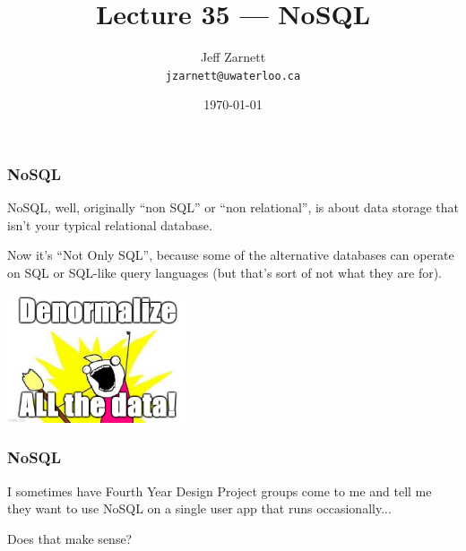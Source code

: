 

\title{Lecture 35 --- NoSQL }

\author{Jeff Zarnett \\ \small \texttt{jzarnett@uwaterloo.ca}}
\date{\today}




\begin{frame}
  \titlepage

 \end{frame}



\begin{frame}
\frametitle{NoSQL}

NoSQL, well, originally ``non SQL'' or ``non relational'', is about data storage that isn't your typical relational database. 

Now it's ``Not Only SQL'', because some of the alternative databases can operate on SQL or SQL-like query languages (but that's sort of not what they are for). 


\begin{center}
	\includegraphics[width=0.4\textwidth]{images/denormalize.jpg}
\end{center}

 \end{frame}



\begin{frame}
\frametitle{NoSQL}


I sometimes have Fourth Year Design Project groups come to me and tell me they want to use NoSQL on a single user app that runs occasionally... 

Does that make sense?


\end{frame}



